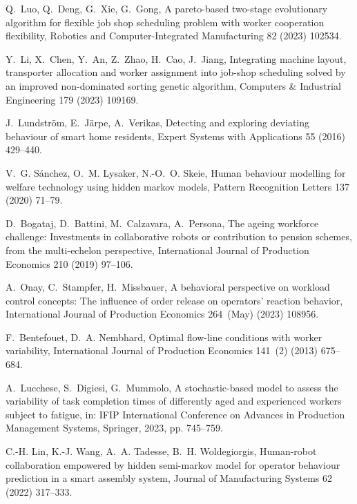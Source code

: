 \documentclass[review,12pt, 3p, times]{elsarticle}
\begin{document}
\begin{thebibliography}{00}
Q.~Luo, Q.~Deng, G.~Xie, G.~Gong, A pareto-based two-stage evolutionary
  algorithm for flexible job shop scheduling problem with worker cooperation
  flexibility, Robotics and Computer-Integrated Manufacturing 82 (2023) 102534.

Y.~Li, X.~Chen, Y.~An, Z.~Zhao, H.~Cao, J.~Jiang, Integrating machine layout,
  transporter allocation and worker assignment into job-shop scheduling solved
  by an improved non-dominated sorting genetic algorithm, Computers \&
  Industrial Engineering 179 (2023) 109169.

J.~Lundström, E.~Järpe, A.~Verikas, Detecting and exploring deviating
  behaviour of smart home residents, Expert Systems with Applications 55 (2016)
  429--440.

V.~G. Sánchez, O.~M. Lysaker, N.-O.~O. Skeie, Human behaviour modelling for
  welfare technology using hidden markov models, Pattern Recognition Letters
  137 (2020) 71--79.

D.~Bogataj, D.~Battini, M.~Calzavara, A.~Persona, {The ageing workforce
  challenge: Investments in collaborative robots or contribution to pension
  schemes, from the multi-echelon perspective}, International Journal of
  Production Economics 210 (2019) 97--106.

A.~Onay, C.~Stampfer, H.~Missbauer, {A behavioral perspective on workload
  control concepts: The influence of order release on operators' reaction
  behavior}, International Journal of Production Economics 264~(May) (2023)
  108956.

F.~Bentefouet, D.~A. Nembhard, {Optimal flow-line conditions with worker
  variability}, International Journal of Production Economics 141~(2) (2013)
  675--684.

A.~Lucchese, S.~Digiesi, G.~Mummolo, A stochastic-based model to assess the
  variability of task completion times of differently aged and experienced
  workers subject to fatigue, in: IFIP International Conference on Advances in
  Production Management Systems, Springer, 2023, pp. 745--759.

C.-H. Lin, K.-J. Wang, A.~A. Tadesse, B.~H. Woldegiorgis, Human-robot
  collaboration empowered by hidden semi-markov model for operator behaviour
  prediction in a smart assembly system, Journal of Manufacturing Systems 62
  (2022) 317--333.


\end{thebibliography}
\end{document}
